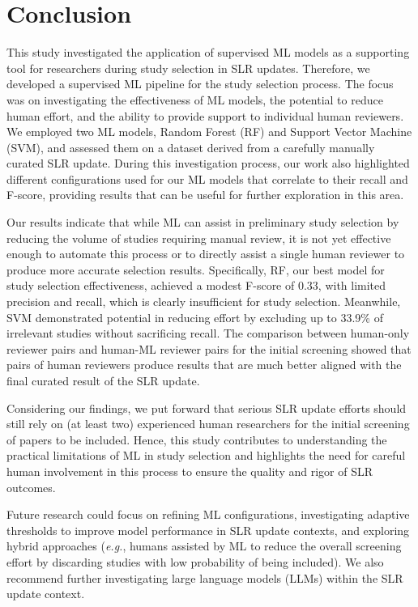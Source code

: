 \section{Conclusion}
\label{sec:conclusion}

This study investigated the application of supervised ML models as a supporting tool for researchers during study selection in SLR updates. Therefore, we developed a supervised ML pipeline for the study selection process. The focus was on investigating the effectiveness of ML models, the potential to reduce human effort, and the ability to provide support to individual human reviewers. We employed two ML models, Random Forest (RF) and Support Vector Machine (SVM), and assessed them on a dataset derived from a carefully manually curated SLR update. During this investigation process, our work also highlighted different configurations used for our ML models that correlate to their recall and F-score, providing results that can be useful for further exploration in this area.

Our results indicate that while ML can assist in preliminary study selection by reducing the volume of studies requiring manual review, it is not yet effective enough to automate this process or to directly assist a single human reviewer to produce more accurate selection results. Specifically, RF, our best model for study selection effectiveness, achieved a modest F-score of 0.33, with limited precision and recall, which is clearly insufficient for study selection. Meanwhile, SVM demonstrated potential in reducing effort by excluding up to 33.9\% of irrelevant studies without sacrificing recall. The comparison between human-only reviewer pairs and human-ML reviewer pairs for the initial screening showed that pairs of human reviewers produce results that are much better aligned with the final curated result of the SLR update. 

Considering our findings, we put forward that serious SLR update efforts should still rely on (at least two) experienced human researchers for the initial screening of papers to be included. Hence, this study contributes to understanding the practical limitations of ML in study selection and highlights the need for careful human involvement in this process to ensure the quality and rigor of SLR outcomes. 

Future research could focus on refining ML configurations, investigating adaptive thresholds to improve model performance in SLR update contexts, and exploring hybrid approaches (\textit{e.g.}, humans assisted by ML to reduce the overall screening effort by discarding studies with low probability of being included). We also recommend further investigating large language models (LLMs) within the SLR update context. 

